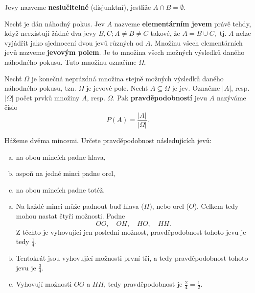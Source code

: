 \begin{definition}
    Jevy nazveme \textbf{neslučitelné} (disjunktní), jestliže $A\cap B = \emptyset.$
\end{definition}

\begin{definition}
    Nechť je dán náhodný pokus. Jev $A$ nazveme \textbf{elementárním jevem} právě tehdy,
    když neexistují žádné dva jevy $B,C; A\ne B\ne C$ takové, že $A=B\cup C,$ tj.
    $A$ nelze vyjádřit jako sjednocení dvou jevů různých od $A.$ Množinu všech
    elementárních jevů nazveme \textbf{jevovým polem}. Je to množina všech možných
    výsledků daného náhodného pokusu. Tuto množinu označíme $\Omega.$
\end{definition}

\begin{definition}
    Nechť $\Omega$ je konečná neprázdná množina stejně možných výsledků daného
    náhodného pokusu, tzn. $\Omega$ je jevové pole. Nechť $A\subseteq \Omega$ je jev.
    Označme $|A|$, resp. $|\Omega|$ počet prvků množiny $A$, resp. $\Omega.$ Pak
    \textbf{pravděpodobností} jevu $A$ nazýváme číslo
    $$P(A)=\frac{|A|}{|\Omega|}.$$
\end{definition}

\begin{priklad}
Hážeme dvěma mincemi. Určete pravděpodobnost následujících jevů:
\begin{enumerate}[a.]
\item na obou mincích padne hlava,
\item aspoň na jedné minci padne orel,
\item na obou mincích padne totéž.
\end{enumerate}
\end{priklad}

\begin{reseni}
\begin{enumerate}[a.]
	\item Na každé minci může padnout buď hlava ($H$), nebo orel ($O$). Celkem tedy mohou nastat čtyři možnosti. Padne
	$$
	    OO, \quad OH, \quad HO, \quad HH.
	$$
	Z těchto je vyhovující jen poslední možnost, pravděpodobnost tohoto jevu je tedy $\frac{1}{4}$.
	\item Tentokrát jsou vyhovující možnosti první tři, a tedy pravděpodobnost tohoto jevu je $\frac{3}{4}$.
	\item Vyhovují možnosti $OO$ a $HH$, tedy pravděpodobnost je $\frac{2}{4}=\frac{1}{2}$.
\end{enumerate}
\end{reseni}

